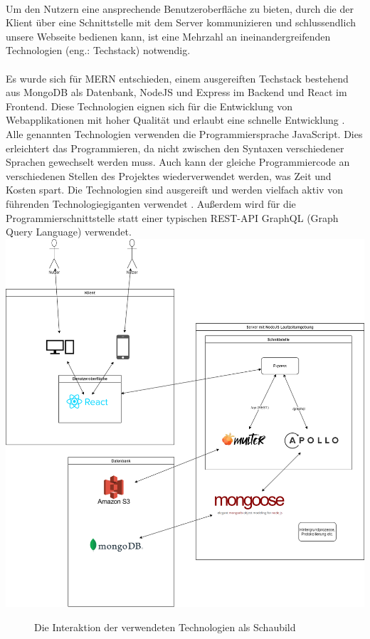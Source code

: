 \paragraph{}
Um den Nutzern eine ansprechende Benutzeroberfläche zu bieten, durch die der Klient über eine Schnittstelle mit dem Server kommunizieren und schlussendlich unsere Webseite bedienen kann, ist eine Mehrzahl an ineinandergreifenden Technologien (eng.: Techstack) notwendig.

\paragraph{}
Es wurde sich für MERN entschieden, einem ausgereiften Techstack bestehend aus MongoDB als Datenbank, NodeJS und Express im Backend und React im Frontend.
Diese Technologien eignen sich für die Entwicklung von Webapplikationen mit hoher Qualität und erlaubt eine schnelle Entwicklung \cite{ti:mernStackAdvantages}.
Alle genannten Technologien verwenden die Programmiersprache JavaScript.
Dies erleichtert das Programmieren, da nicht zwischen den Syntaxen verschiedener Sprachen gewechselt werden muss.
Auch kann der gleiche Programmiercode an verschiedenen Stellen des Projektes wiederverwendet werden, was Zeit und Kosten spart.
Die Technologien sind ausgereift und werden vielfach aktiv von führenden Technologiegiganten verwendet \cite{ti:mongo}\cite{ti:express}\cite{ti:react}\cite{ti:node}.
Außerdem wird für die Programmierschnittstelle statt einer typischen REST-API GraphQL (Graph Query Language) verwendet. \\

\includegraphics[width=\textwidth]{sources/MERN-Stack_Schaubild.drawio}
\begin{figure}[ht]
	\centering
	\caption{Die Interaktion der verwendeten Technologien als Schaubild}
	\label{figMERN1}
\end{figure}

